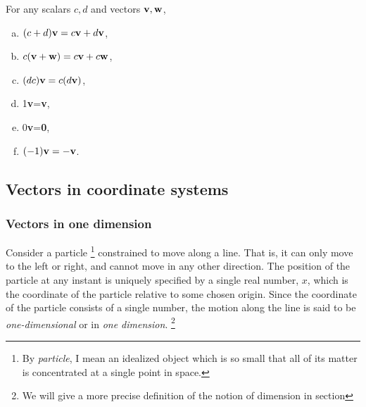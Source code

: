 \documentclass[12pt,letterpaper,reqno]{article}
\numberwithin{equation}{section}
\newcommand{\fixme}[1]{{\color{orange}{[#1]}}}
\begin{document}
\begin{prop}
For any scalars $c,d$ and vectors ${\bf v}, {\bf w}$,
	\begin{enumerate}[(a)]
		\item $(c+d){\bf v}=c{\bf v}+d{\bf v}$,
		\item $c({\bf v}+{\bf w})=c{\bf v}+c{\bf w}$,
		\item $(dc){\bf v}=c(d{\bf v})$,
		\item 1{\bf v}={\bf v},
		\item 0{\bf v}={\bf 0},
		\item $(-1){\bf v}=-{\bf v}$.
	\end{enumerate}
\end{prop}

\begin{pf}
	\fixme{Add proof. Does 1 depend on the triangle inequality?}
\end{pf}

\subsection{Vectors in coordinate systems}
\subsubsection{Vectors in one dimension}
Consider a particle \footnote{By \emph{particle}, I mean an idealized object which is so small that all of its matter is concentrated at a single point in space.} constrained to move along a line. That is, it can only move to the left or right, and cannot move in any other direction. The position of the particle at any instant is uniquely specified by a single real number, $x$, which is the coordinate of the particle relative to some chosen origin. Since the coordinate of the particle consists of a single number, the motion along the line is said to be \emph{one-dimensional} or in \emph{one dimension}. \footnote{We will give a more precise definition of the notion of dimension in section \fixme{Insert section number.}} 
\end{document}

